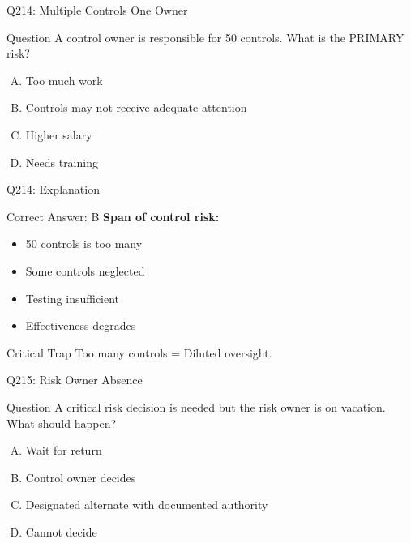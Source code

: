 \documentclass{beamer}
\begin{document}
	\begin{frame}{Q214: Multiple Controls One Owner}
		\begin{block}{Question}
			A control owner is responsible for 50 controls. What is the PRIMARY risk?
		\end{block}
		\begin{enumerate}[(A)]
			\item Too much work
			\item Controls may not receive adequate attention
			\item Higher salary
			\item Needs training
		\end{enumerate}
	\end{frame}
	
	\begin{frame}{Q214: Explanation}
		\begin{block}{Correct Answer: B}
			\textbf{Span of control risk:}
			\begin{itemize}
				\item 50 controls is too many
				\item Some controls neglected
				\item Testing insufficient
				\item Effectiveness degrades
			\end{itemize}
		\end{block}
		\begin{alertblock}{Critical Trap}
			Too many controls = Diluted oversight.
		\end{alertblock}
	\end{frame}
	
	\begin{frame}{Q215: Risk Owner Absence}
		\begin{block}{Question}
			A critical risk decision is needed but the risk owner is on vacation. What should happen?
		\end{block}
		\begin{enumerate}[(A)]
			\item Wait for return
			\item Control owner decides
			\item Designated alternate with documented authority
			\item Cannot decide
		\end{enumerate}
	\end{frame}
	
\end{document}
